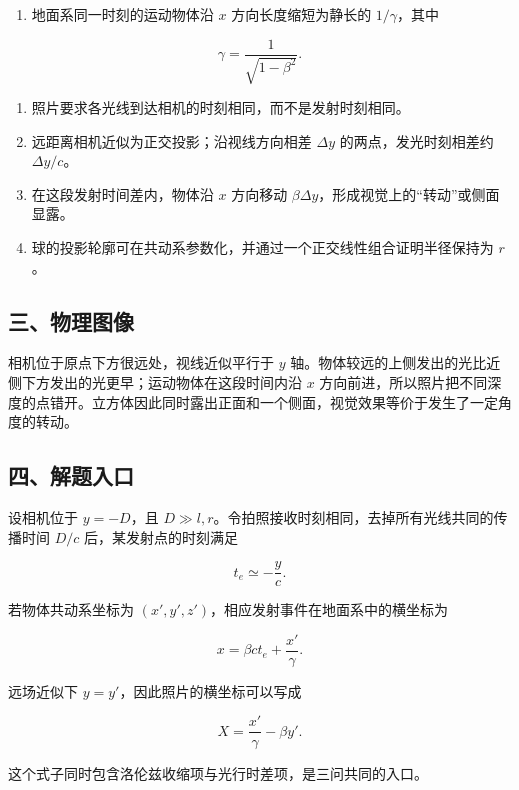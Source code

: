 \documentclass[12pt,a4paper,UTF8]{ctexart}
\newcommand{\tightlist}{\setlength{\itemsep}{0pt}\setlength{\parskip}{0pt}}
\begin{document}
\begin{enumerate}
\def\labelenumi{\arabic{enumi}.}
\tightlist
\item
  地面系同一时刻的运动物体沿 \(x\) 方向长度缩短为静长的
  \(1/\gamma\)，其中
\end{enumerate}

\[\gamma=\frac1{\sqrt{1-\beta^2}}.\]

\begin{enumerate}
\def\labelenumi{\arabic{enumi}.}
\setcounter{enumi}{1}
\tightlist
\item
  照片要求各光线到达相机的时刻相同，而不是发射时刻相同。
\item
  远距离相机近似为正交投影；沿视线方向相差 \(\Delta y\)
  的两点，发光时刻相差约 \(\Delta y/c\)。
\item
  在这段发射时间差内，物体沿 \(x\) 方向移动
  \(\beta\Delta y\)，形成视觉上的``转动''或侧面显露。
\item
  球的投影轮廓可在共动系参数化，并通过一个正交线性组合证明半径保持为
  \(r\)。
\end{enumerate}

\subsection{三、物理图像}\label{ux4e09ux7269ux7406ux56feux50cf-7}

相机位于原点下方很远处，视线近似平行于 \(y\)
轴。物体较远的上侧发出的光比近侧下方发出的光更早；运动物体在这段时间内沿
\(x\)
方向前进，所以照片把不同深度的点错开。立方体因此同时露出正面和一个侧面，视觉效果等价于发生了一定角度的转动。

\subsection{四、解题入口}\label{ux56dbux89e3ux9898ux5165ux53e3-7}

设相机位于 \(y=-D\)，且
\(D\gg l,r\)。令拍照接收时刻相同，去掉所有光线共同的传播时间 \(D/c\)
后，某发射点的时刻满足

\[t_e\simeq-\frac{y}{c}.\]

若物体共动系坐标为 \((x',y',z')\)，相应发射事件在地面系中的横坐标为

\[x=\beta ct_e+\frac{x'}{\gamma}.\]

远场近似下 \(y=y'\)，因此照片的横坐标可以写成

\[X=\frac{x'}{\gamma}-\beta y'.\]

这个式子同时包含洛伦兹收缩项与光行时差项，是三问共同的入口。
\end{document}
